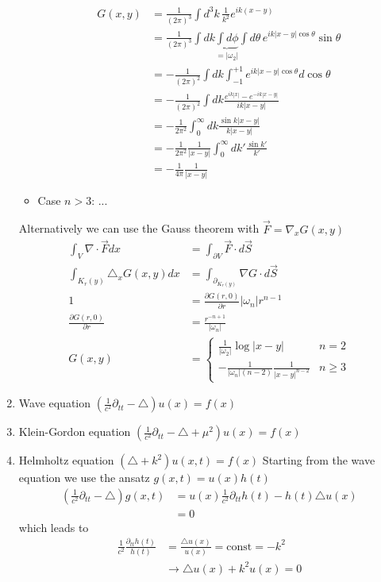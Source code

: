 \documentclass[10pt,a4paper]{article}
\theoremstyle{definition}
\begin{document}
\begin{enumerate}
\begin{itemize}
\begin{align}
            G(x,y)&=\frac{1}{(2\pi)^{3}}\int d^3k\,\frac{1}{k^2}e^{ik(x-y)}\\
            &=\frac{1}{(2\pi)^{3}}\int dk\underbrace{\int d\phi}_{=|\omega_2|} \int d\theta\,e^{ik|x-y|\cos\theta}\sin\theta\\
            &=-\frac{1}{(2\pi)^{2}}\int dk \int_{-1}^{+1} e^{ik|x-y|\cos\theta}d\cos\theta\\
            &=-\frac{1}{(2\pi)^{2}}\int dk \frac{e^{ik|x|}-e^{-ik|x-y|}}{ik|x-y|}\\
            &=-\frac{1}{2\pi^2}\int_0^\infty dk \frac{\sin k|x-y|}{k|x-y|}\\
            &=-\frac{1}{2\pi^2}\frac{1}{|x-y|}\int_0^\infty dk' \frac{\sin k'}{k'}\\
            &=-\frac{1}{4\pi}\frac{1}{|x-y|}
        \end{align}
        \item Case $n>3$:
        ...
        
    \end{itemize}

Alternatively we can use the Gauss theorem with $\vec{F}=\nabla_x G(x,y)$
\begin{align}
    \int_V \nabla\cdot \vec{F} dx&=\int_{\partial V} \vec{F}\cdot d\vec{S}\\
    \int_{K_r(y)} \triangle_x G(x,y) dx&=\int_{\partial _{K_r(y)}} \nabla G\cdot d\vec{S}\\
    1&=\frac{\partial G(r,0)}{\partial r}|\omega_{n}|r^{n-1}\\
    \frac{\partial G(r,0)}{\partial r} &= \frac{r^{-n+1}}{|\omega_n|}\\
    G(x,y)&=\left\{\begin{array}{cc}
         \frac{1}{|\omega_2|}\log{|x-y|}                    & n=2  \\
         -\frac{1}{|\omega_n|(n-2)}\frac{1}{|x-y|^{n-2}}    & n\ge3 
    \end{array}\right.
\end{align}


\item Wave equation $\left(\frac{1}{c^2}\partial_{tt}-\triangle\right) u(x)= f(x)$
\item Klein-Gordon equation $\left(\frac{1}{c^2}\partial_{tt}-\triangle+\mu^2\right) u(x)= f(x)$

\item Helmholtz equation $(\triangle +k^2)u(x,t)= f(x)$
Starting from the wave equation we use the ansatz $g(x,t)=u(x)h(t)$
\begin{align}
    \left(\frac{1}{c^2}\partial_{tt}-\triangle\right) g(x,t)
    &=u(x)\frac{1}{c^2}\partial_{tt}h(t)-h(t)\triangle u(x)\\
    &=0
\end{align}
which leads to
\begin{align}
    \frac{1}{c^2}\frac{\partial_{tt}h(t)}{h(t)}&=\frac{\triangle u(x)}{u(x)}=\text{const}=-k^2\\
    &\rightarrow \triangle u(x) + k^2 u(x)=0
\end{align}



\end{enumerate}
\end{document}
